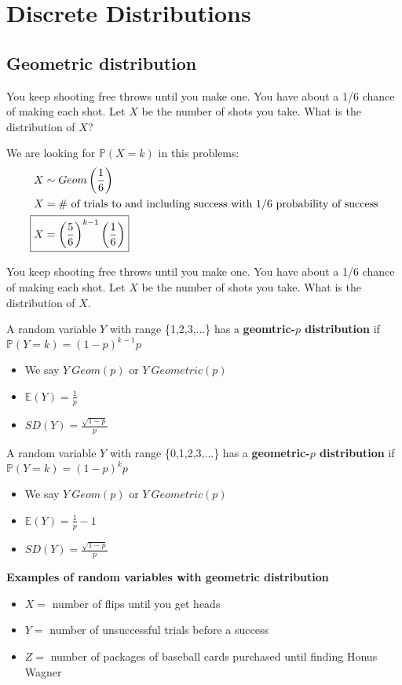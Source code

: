 \documentclass[titlepage, 12pt, leqno]{article}
\begin{document}
\pagebreak
\section{Discrete Distributions}
\subsection{Geometric distribution}
\begin{ex}
    You keep shooting free throws until you make one. You have about
    a 1/6 chance of making each shot. Let $X$ be the number of shots you take. 
    What is the distribution of $X$?
    \vspace{10px}
    
    We are looking for $\mathbb{P}(X=k)$ in this problems:
   \begin{align*}
       X& \sim Geom\left(\frac{1}{6}\right) \\
       X &= \text{\# of trials to and including success with 1/6 probability
       of success} \\
           \Aboxed{X &= \left(\frac{5}{6}\right)^{k-1}\left(\frac{1}{6}\right)}
   \end{align*}
\end{ex}

You keep shooting free throws until you make one. You have about
a 1/6 chance of making each shot. Let $X$ be the number of shots you take. What is
the distribution of $X$.

\begin{definition}
    A random variable $Y$ with range \{1,2,3,...\} has a 
    \textbf{geomtric-$p$ distribution} if $\mathbb{P}(Y=k) = (1-p)^{k-1}p$
    \begin{itemize}
        \item We say $Y ~ Geom(p)$ or $Y ~ Geometric(p)$
        \item $ \mathbb{E}(Y) = \frac{1}{p}$
        \item $SD(Y) = \frac{\sqrt{1-p}}{p}$
    \end{itemize}
    
    A random variable $Y$ with range \{0,1,2,3,...\} has a 
    \textbf{geometric-$p$ distribution} if $\mathbb{P}(Y=k) = (1-p)^kp$
    \begin{itemize}
        \item We say $Y ~ Geom(p)$ or $Y ~ Geometric(p)$
        \item $ \mathbb{E}(Y) = \frac{1}{p}-1$
        \item $SD(Y) = \frac{\sqrt{1-p}}{p}$
    \end{itemize}
\end{definition}

\textbf{Examples of random variables with geometric distribution}
\begin{itemize}
    \item $X = $ number of flips until you get heads
    \item $Y = $ number of unsuccessful trials before a success
    \item $Z = $ number of packages of baseball cards purchased until finding
        Honus Wagner
\end{itemize}

\pagebreak
\end{document}
